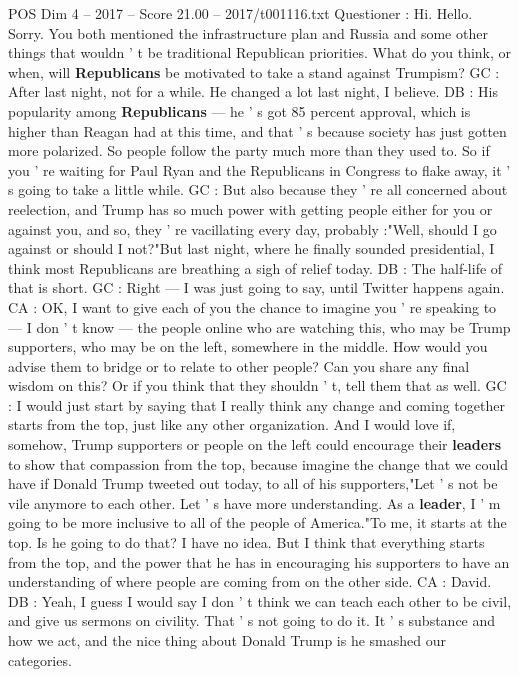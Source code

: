 \begin{textsample}{POS Dim 4 – 2017 – Score 21.00 – 2017/t001116.txt}
Questioner : Hi.
Hello.
Sorry.
You both mentioned the infrastructure plan and Russia and some other things that wouldn ' t be traditional Republican priorities.
What do you think, or when, will \textbf{Republicans} be motivated to take a stand against Trumpism?
GC : After last night, not for a while.
He changed a lot last night, I believe.
DB : His popularity among \textbf{Republicans} — he ' s got 85 percent approval, which is higher than Reagan had at this time, and that ' s because society has just gotten more polarized.
So people follow the party much more than they used to.
So if you ' re waiting for Paul Ryan and the Republicans in Congress to flake away, it ' s going to take a little while.
GC : But also because they ' re all concerned about reelection, and Trump has so much power with getting people either for you or against you, and so, they ' re vacillating every day, probably :"Well, should I go against or should I not?"But last night, where he finally sounded presidential, I think most Republicans are breathing a sigh of relief today.
DB : The half-life of that is short.
GC : Right — I was just going to say, until Twitter happens again.
CA : OK, I want to give each of you the chance to imagine you ' re speaking to — I don ' t know — the people online who are watching this, who may be Trump supporters, who may be on the left, somewhere in the middle.
How would you advise them to bridge or to relate to other people?
Can you share any final wisdom on this?
Or if you think that they shouldn ' t, tell them that as well.
GC : I would just start by saying that I really think any change and coming together starts from the top, just like any other organization.
And I would love if, somehow, Trump supporters or people on the left could encourage their \textbf{leaders} to show that compassion from the top, because imagine the change that we could have if Donald Trump tweeted out today, to all of his supporters,"Let ' s not be vile anymore to each other.
Let ' s have more understanding.
As a \textbf{leader}, I ' m going to be more inclusive to all of the people of America."To me, it starts at the top.
Is he going to do that?
I have no idea.
But I think that everything starts from the top, and the power that he has in encouraging his supporters to have an understanding of where people are coming from on the other side.
CA : David.
DB : Yeah, I guess I would say I don ' t think we can teach each other to be civil, and give us sermons on civility.
That ' s not going to do it.
It ' s substance and how we act, and the nice thing about Donald Trump is he smashed our categories.

\end{textsample}
